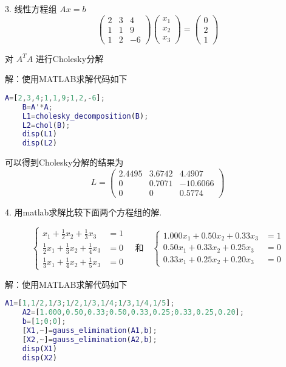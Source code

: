 \documentclass{ctexart}
\begin{document}
3. {\kaishu 线性方程组}  $A x=b$
\[
\left(\begin{array}{ccc}
2 & 3 & 4 \\
1 & 1 & 9 \\
1 & 2 & -6
\end{array}\right)\left(\begin{array}{l}
x_{1} \\
x_{2} \\
x_{3}
\end{array}\right)=\left(\begin{array}{l}
0 \\
2 \\
1
\end{array}\right)
\]

{\kaishu 对 $A^{T} A$ 进行Cholesky分解}

解：使用MATLAB求解代码如下
\begin{lstlisting}[language=matlab]
    A=[2,3,4;1,1,9;1,2,-6];
    B=A'*A;
    L1=cholesky_decomposition(B);
    L2=chol(B);
    disp(L1)
    disp(L2)
\end{lstlisting}
可以得到Cholesky分解的结果为
\[
L=\left(\begin{array}{ccc}
2.4495&3.6742&4.4907\\
0&0.7071&-10.6066\\
0&0&0.5774
\end{array}\right)
\]


4. {\kaishu 用matlab求解比较下面两个方程组的解.}

\[
\left\{
\begin{aligned}
x_{1} + \frac{1}{2} x_{2} + \frac{1}{3} x_{3} &= 1 \\
\frac{1}{2} x_{1} + \frac{1}{3} x_{2} + \frac{1}{4} x_{3} &= 0 \\
\frac{1}{3} x_{1} + \frac{1}{4} x_{2} + \frac{1}{5} x_{3} &= 0
\end{aligned}
\right.
\quad \text{和} \quad
\left\{
\begin{aligned}
1.000 x_{1} + 0.50 x_{2} + 0.33 x_{3} &= 1 \\
0.50 x_{1} + 0.33 x_{2} + 0.25 x_{3} &= 0 \\
0.33 x_{1} + 0.25 x_{2} + 0.20 x_{3} &= 0
\end{aligned}
\right.
\]

解：使用MATLAB求解代码如下
\begin{lstlisting}[language=matlab]
    A1=[1,1/2,1/3;1/2,1/3,1/4;1/3,1/4,1/5];
    A2=[1.000,0.50,0.33;0.50,0.33,0.25;0.33,0.25,0.20];
    b=[1;0;0];
    [X1,~]=gauss_elimination(A1,b);
    [X2,~]=gauss_elimination(A2,b);
    disp(X1)
    disp(X2)
\end{lstlisting}
\end{document}
